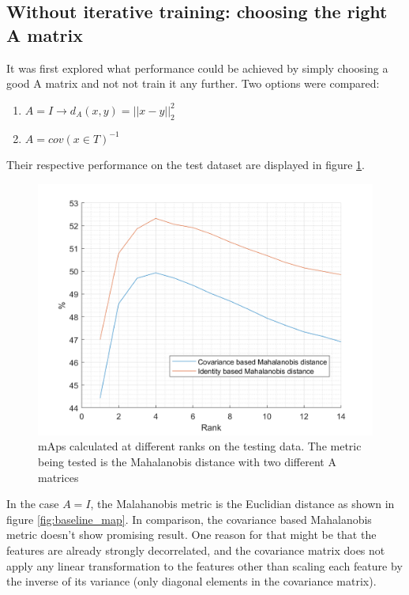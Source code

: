 \documentclass[10pt,technote]{IEEEtran}
\begin{document}
\subsection{Without iterative training: choosing the right A matrix}
It was first explored what performance could be achieved by simply choosing a good A matrix and not not train it any further. Two options were compared:
\begin{enumerate}
    \item $A = I \rightarrow d_A(x, y) = ||x - y||_2^2$
    \item $A = cov(x \in T)^{-1}$
\end{enumerate}
Their respective performance on the test dataset are displayed in figure \ref{fig:maha_map}. 

\begin{figure}
    \centering
    \includegraphics[width=\linewidth]{Graphs/maha_Map.png}
    \caption{mAps calculated at different ranks on the testing data. The metric being tested is the Mahalanobis distance with two different A matrices}
    \label{fig:maha_map}
\end{figure}

In the case $A = I$, the Malahanobis metric is the Euclidian distance as shown in figure \ref{fig:baseline_map}. In comparison, the covariance based Mahalanobis metric doesn't show promising result. One reason for that might be that the features are already strongly decorrelated, and the covariance matrix does not apply any linear transformation to the features other than scaling each feature by the inverse of its variance (only diagonal elements in the covariance matrix). 
\end{document}
